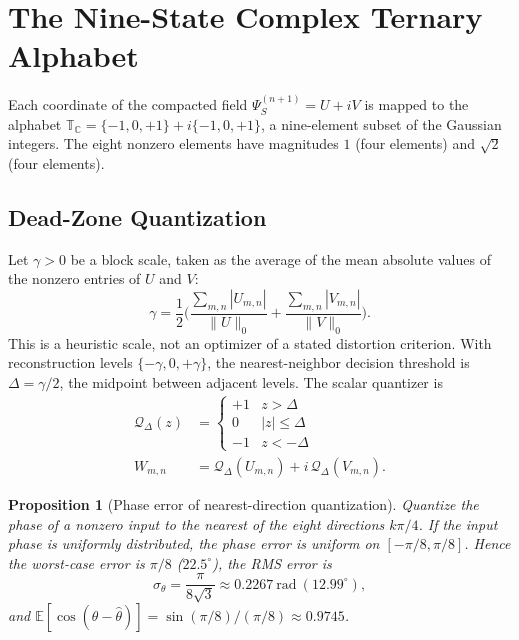 \documentclass[10pt, twocolumn, a4paper]{article}
\newtheorem{proposition}{Proposition}
\begin{document}
\section{The Nine-State Complex Ternary Alphabet}

Each coordinate of the compacted field $\Psi_S^{(n+1)}=U+iV$ is mapped to the alphabet $\mathbb{T}_{\mathbb{C}}=\{-1,0,+1\}+i\{-1,0,+1\}$, a nine-element subset of the Gaussian integers. The eight nonzero elements have magnitudes $1$ (four elements) and $\sqrt{2}$ (four elements).

\subsection{Dead-Zone Quantization}
Let $\gamma>0$ be a block scale, taken as the average of the mean absolute values of the nonzero entries of $U$ and $V$:
\begin{equation}
\gamma = \frac{1}{2}\Big(\frac{\sum_{m,n}|U_{m,n}|}{\|U\|_0}+\frac{\sum_{m,n}|V_{m,n}|}{\|V\|_0}\Big).
\end{equation}
This is a heuristic scale, not an optimizer of a stated distortion criterion. With reconstruction levels $\{-\gamma,0,+\gamma\}$, the nearest-neighbor decision threshold is $\Delta=\gamma/2$, the midpoint between adjacent levels. The scalar quantizer is
\begin{equation}
\begin{split}\mathcal{Q}_{\Delta}(z)&=\begin{cases}+1 & z>\Delta\\ 0 & |z|\le\Delta\\ -1 & z<-\Delta\end{cases}\\ W_{m,n}&=\mathcal{Q}_{\Delta}(U_{m,n})+i\,\mathcal{Q}_{\Delta}(V_{m,n}).\end{split}
\end{equation}

\begin{proposition}[Phase error of nearest-direction quantization]\label{prop:phase}
Quantize the phase of a nonzero input to the nearest of the eight directions $k\pi/4$. If the input phase is uniformly distributed, the phase error is uniform on $[-\pi/8,\pi/8]$. Hence the worst-case error is $\pi/8$ ($22.5^\circ$), the RMS error is
\begin{equation}
\sigma_\theta=\frac{\pi}{8\sqrt{3}}\approx 0.2267\ \text{rad}\ (12.99^\circ),
\end{equation}
and $\mathbb{E}[\cos(\theta-\hat\theta)]=\sin(\pi/8)/(\pi/8)\approx 0.9745$.
\end{proposition}
\end{document}
